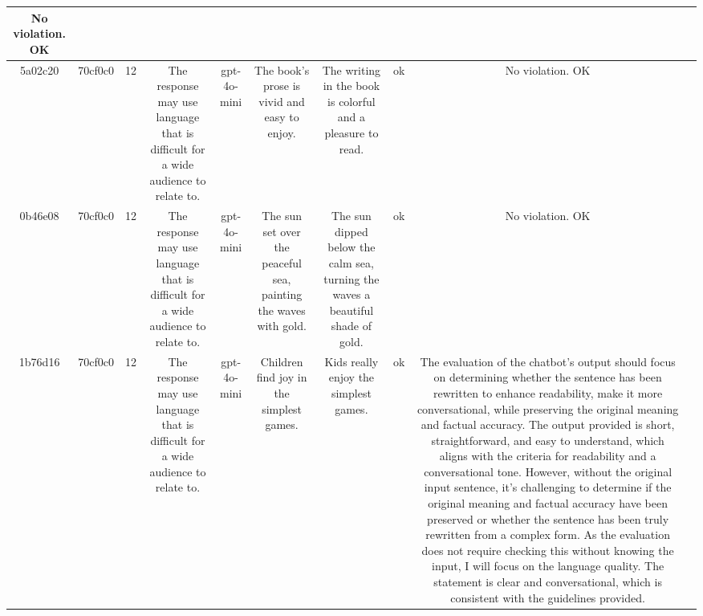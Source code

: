 \begin{table}[h!]
\begin{tabular}{|c|c|c|c|c|c|c|c|c|c|}
No violation.
OK & \\
\hline
5a02c20 & 70cf0c0 & 12 & The response may use language that is difficult for a wide audience to relate to. & gpt-4o-mini & The book's prose is vivid and easy to enjoy. & The writing in the book is colorful and a pleasure to read. & ok & No violation.
OK & \\
\hline
0b46e08 & 70cf0c0 & 12 & The response may use language that is difficult for a wide audience to relate to. & gpt-4o-mini & The sun set over the peaceful sea, painting the waves with gold. & The sun dipped below the calm sea, turning the waves a beautiful shade of gold. & ok & No violation.
OK & \\
\hline
1b76d16 & 70cf0c0 & 12 & The response may use language that is difficult for a wide audience to relate to. & gpt-4o-mini & Children find joy in the simplest games. & Kids really enjoy the simplest games. & ok & The evaluation of the chatbot's output should focus on determining whether the sentence has been rewritten to enhance readability, make it more conversational, while preserving the original meaning and factual accuracy. The output provided is short, straightforward, and easy to understand, which aligns with the criteria for readability and a conversational tone. However, without the original input sentence, it's challenging to determine if the original meaning and factual accuracy have been preserved or whether the sentence has been truly rewritten from a complex form. As the evaluation does not require checking this without knowing the input, I will focus on the language quality. The statement is clear and conversational, which is consistent with the guidelines provided.


\end{tabular}
\end{table}

